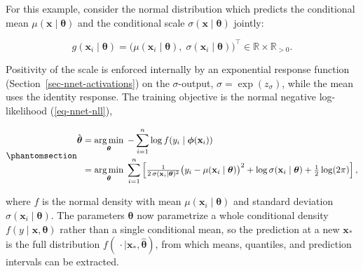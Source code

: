 \documentclass[
  letterpaper,
  krantz2]{style/krantz}
\begin{document}
For this example, consider the normal distribution which predicts the
conditional mean \(\mu(\mathbf{x}\mid \boldsymbol{\theta})\) and the
conditional scale \(\sigma(\mathbf{x}\mid \boldsymbol{\theta})\)
jointly:

\[
g(\mathbf{x}_i \mid \boldsymbol{\theta}) = \bigl(\mu(\mathbf{x}_i \mid \boldsymbol{\theta}),\; \sigma(\mathbf{x}_i \mid \boldsymbol{\theta})\bigr)^\top\in \mathbb{R}\times \mathbb{R}_{>0}.
\]

Positivity of the scale is enforced internally by an exponential
response function (Section~\ref{sec-nnet-activations}) on the
\(\sigma\)-output, \(\sigma = \exp(z_\sigma)\), while the mean uses the
identity response. The training objective is the normal negative
log-likelihood (\ref{eq-nnet-nll}),

\begin{equation}\phantomsection\label{eq-nnet-gauss-nll}{
\begin{aligned}
\hat{\boldsymbol{\theta}}
&= \mathop{\mathrm{arg\,min}}_{\boldsymbol{\theta}}\; -\sum_{i=1}^n \log f(y_i \mid \boldsymbol{\phi}(\mathbf{x}_i)) \\
&= \mathop{\mathrm{arg\,min}}_{\boldsymbol{\theta}}\; \sum_{i=1}^{n} \left[\tfrac{1}{2\,\sigma(\mathbf{x}_i \mid \boldsymbol{\theta})^2}\bigl(y_i - \mu(\mathbf{x}_i \mid \boldsymbol{\theta})\bigr)^2 + \log \sigma(\mathbf{x}_i \mid \boldsymbol{\theta}) + \tfrac{1}{2}\log(2\pi)\right],
\end{aligned}
}\end{equation}

where \(f\) is the normal density with mean
\(\mu(\mathbf{x}_i \mid \boldsymbol{\theta})\) and standard deviation
\(\sigma(\mathbf{x}_i \mid \boldsymbol{\theta})\). The parameters
\(\boldsymbol{\theta}\) now parametrize a whole conditional density
\(f(y \mid \mathbf{x}, \boldsymbol{\theta})\) rather than a single
conditional mean, so the prediction at a new \(\mathbf{x}_*\) is the
full distribution
\(f(\,\cdot \mid \mathbf{x}_*, \hat{\boldsymbol{\theta}})\), from which
means, quantiles, and prediction intervals can be extracted.
\end{document}
